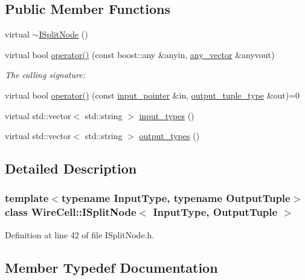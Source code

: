 \subsection*{Public Member Functions}
\begin{DoxyCompactItemize}
\item 
virtual \hyperlink{class_wire_cell_1_1_i_split_node_ae89ad2fc266377589e4041c0cf84b350}{$\sim$\+I\+Split\+Node} ()
\item 
virtual bool \hyperlink{class_wire_cell_1_1_i_split_node_a7c33f98661c236a21d093bb40374186b}{operator()} (const boost\+::any \&anyin, \hyperlink{class_wire_cell_1_1_i_split_node_base_af68870ead16af4b29a3b0d486f217fe8}{any\+\_\+vector} \&anyvout)
\begin{DoxyCompactList}\small\item\em The calling signature\+: \end{DoxyCompactList}\item 
virtual bool \hyperlink{class_wire_cell_1_1_i_split_node_aa0a69c19d5dacc4ebf3c6acec4120933}{operator()} (const \hyperlink{class_wire_cell_1_1_i_split_node_a270990964b36cf939159efa595779407}{input\+\_\+pointer} \&in, \hyperlink{class_wire_cell_1_1_i_split_node_acd382a6b5a9c3f322943ce2dd66fa7f4}{output\+\_\+tuple\+\_\+type} \&out)=0
\item 
virtual std\+::vector$<$ std\+::string $>$ \hyperlink{class_wire_cell_1_1_i_split_node_a777776f3e11a8fb95c1e8974249a1f8d}{input\+\_\+types} ()
\item 
virtual std\+::vector$<$ std\+::string $>$ \hyperlink{class_wire_cell_1_1_i_split_node_a924ce0894e2f6dec8fb49b14923df91d}{output\+\_\+types} ()
\end{DoxyCompactItemize}


\subsection{Detailed Description}
\subsubsection*{template$<$typename Input\+Type, typename Output\+Tuple$>$\newline
class Wire\+Cell\+::\+I\+Split\+Node$<$ Input\+Type, Output\+Tuple $>$}



Definition at line 42 of file I\+Split\+Node.\+h.



\subsection{Member Typedef Documentation}
\mbox{\label{class_wire_cell_1_1_i_split_node_a270990964b36cf939159efa595779407}} 
